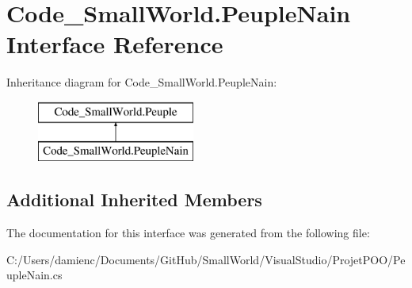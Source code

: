 \hypertarget{interface_code___small_world_1_1_peuple_nain}{\section{Code\-\_\-\-Small\-World.\-Peuple\-Nain Interface Reference}
\label{interface_code___small_world_1_1_peuple_nain}
}
Inheritance diagram for Code\-\_\-\-Small\-World.\-Peuple\-Nain\-:\begin{figure}[H]
\begin{center}
\leavevmode
\includegraphics[height=2.000000cm]{interface_code___small_world_1_1_peuple_nain}
\end{center}
\end{figure}
\subsection*{Additional Inherited Members}


The documentation for this interface was generated from the following file\-:\begin{DoxyCompactItemize}
\item 
C\-:/\-Users/damienc/\-Documents/\-Git\-Hub/\-Small\-World/\-Visual\-Studio/\-Projet\-P\-O\-O/Peuple\-Nain.\-cs\end{DoxyCompactItemize}
